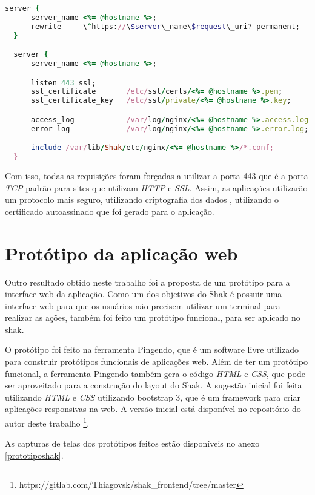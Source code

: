 \begin{lstlisting}[language=Ruby,label=dice_index,caption={Exemplo de arquivo de configuração do Nginx para aplicações web no shak}, label=codigo994]
  server {
      server_name <%= @hostname %>;
      rewrite     \^https://\$server\_name\$request\_uri? permanent;
  }

  server {
      server_name <%= @hostname %>;

      listen 443 ssl;
      ssl_certificate       /etc/ssl/certs/<%= @hostname %>.pem;
      ssl_certificate_key   /etc/ssl/private/<%= @hostname %>.key;

      access_log            /var/log/nginx/<%= @hostname %>.access.log;
      error_log             /var/log/nginx/<%= @hostname %>.error.log;

      include /var/lib/Shak/etc/nginx/<%= @hostname %>/*.conf;
  }
\end{lstlisting}

Com isso, todas as requisições foram forçadas a utilizar a porta 443 que é a porta
\textit{TCP} padrão para sites que utilizam \textit{HTTP} e \textit{SSL}. Assim, 
as aplicações utilizarão um protocolo mais seguro, utilizando criptografia dos dados
, utilizando o certificado autoassinado que foi gerado para o aplicação.

\section{Protótipo da aplicação web}
\label{sub:prototipo}

Outro resultado obtido neste trabalho foi a proposta de um protótipo para a interface
web da aplicação. Como um dos objetivos do Shak é possuir uma interface web para que
os usuários não precisem utilizar um terminal para realizar as ações, também foi
feito um protótipo funcional, para ser aplicado no shak. 

O protótipo foi feito
na ferramenta Pingendo, que é um software livre utilizado para construir
protótipos funcionais de aplicações web. Além de ter um protótipo funcional, a 
ferramenta Pingendo
também gera o código \textit{HTML} e \textit{CSS}, que pode ser aproveitado para 
a construção do layout do Shak. A sugestão inicial foi feita utilizando \textit{HTML} e \textit{CSS} utilizando bootstrap 3, que é um framework para criar aplicações responsivas 
na web. A versão inicial está disponível no repositório do autor deste trabalho 
\footnote{https://gitlab.com/Thiagovsk/shak\_frontend/tree/master}.

As capturas de telas dos protótipos feitos estão disponíveis no anexo \ref{prototiposhak}.
